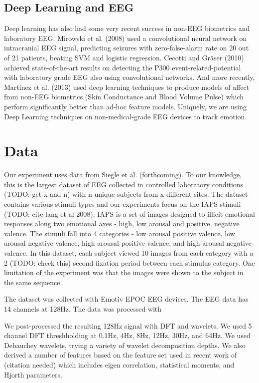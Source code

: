 \documentclass{article} %
\begin{document}
\subsection{Deep Learning and EEG}
Deep learning has also had some very recent success in non-EEG biometrics and laboratory EEG. Mirowski et al. (2008) used a convolutional neural network on intracranial EEG signal, predicting seizures with zero-false-alarm rate on 20 out of 21 patients, beating SVM and logistic regression. Cecotti and Gräser (2010) achieved state-of-the-art results on detecting the P300 event-related-potential with laboratory grade EEG also using convolutional networks. And more recently, Martinez et al.
(2013) used deep learning techniques to produce models of affect from non-EEG biometrics (Skin Conductance and Blood Volume Pulse) which perform significantly better than ad-hoc feature models.
Uniquely, we are using Deep Learning techniques on non-medical-grade EEG devices to track emotion.

\section{Data} \label{section:data}
Our experiment uses data from Siegle et al. (forthcoming). To our knowledge, this is the largest dataset of EEG collected in controlled laboratory conditions (TODO: get x and n) with n unique subjects from x different sites. The dataset contains various stimuli types and our experiments focus on the IAPS stimuli (TODO: cite lang et al 2008). IAPS is a set of images designed to illicit emotional responses along two emotional axes - high, low arousal and positive, negative valence. The stimuli
fall into 4 categories - low arousal positive valence, low arousal negative valence, high arousal positive valence, and high arousal negative valence. In this dataset, each subject viewed 10 images from each category with a 2 (TODO: check this) second fixation period between each stimulus category. One limitation of the experiment was that the images were shown to the subject in the same sequence.

The dataset was collected with Emotiv EPOC EEG devices. The EEG data has 14 channels at 128Hz.  The data was processed with %

We post-processed the resulting 128Hz signal with DFT and wavelets. We used 5 channel DFT threshholding at 0.1Hz, 4Hz, 8Hz, 12Hz, 30Hz, and 64Hz. We used Debauchey wavelets, trying a variety of wavelet decomposition depths. We also derived a number of features based on the feature set used in recent work of (citation needed) which includes eigen correlation, statistical moments, and Hjorth parameters.
\end{document}

